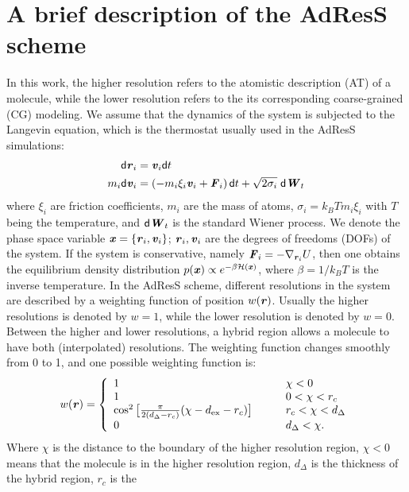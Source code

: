 \documentclass[aip,jcp,a4paper,reprint,onecolumn]{revtex4-1}
\newcommand{\vect}[1]{\textbf{\textit{#1}}}
\newcommand{\dd}[1]{\textsf{#1}}
\newcommand{\HY}{{\Delta}}
\begin{document}
\section{A brief description of the AdResS scheme}

In this work, the higher resolution refers to the atomistic
description (AT) of a molecule, while the lower resolution refers to
the its corresponding coarse-grained (CG) modeling.  We assume that the dynamics of the
system is subjected to the Langevin equation, which is the thermostat
usually used in the AdResS simulations:
\begin{align}
  \dd d\vect r_i &= \vect v_i\dd dt\\
  m_i\dd d\vect v_i &= (-m_i\xi_i\vect v_i + \vect F_i)\,\dd dt + \sqrt{2\sigma_i}\;\dd d\vect W_t
\end{align}
where $\xi_i$ are friction coefficients,
$m_i$ are the mass of atoms, $\sigma_i = k_BTm_i\xi_i$ with $T$ being
the temperature, and
$\dd d\vect W_t$ is the standard Wiener process. We denote the
phase space variable $\vect x = \{\vect r_i, \vect v_i\}$; $\vect r_i,
\vect v_i$ are the degrees of freedoms (DOFs) of the system.  If the
system is conservative, namely $\vect F_i = -\nabla_{\vect r_i}U$,
then one obtains the equilibrium density distribution $p(\vect
x)\propto e^{-\beta\mathcal H(\vect x)}$, where $\beta = 1/k_BT$ is the inverse temperature. In the AdResS scheme,
different resolutions in the system are described by a weighting
function of position $w(\vect r)$. Usually the higher resolutions is
denoted by $w = 1$, while the lower resolution is denoted by $w = 0$.
Between the higher and lower resolutions, a hybrid region allows a 
molecule to have both (interpolated) resolutions. The weighting function changes smoothly
from 0 to 1, and one possible weighting function is:
\begin{align}\label{eqn:new-w}
  w(\vect r) =
  \left\{
    \begin{array}{lcl}
      1 &\quad& \chi < 0\\
      1  && 0 < \chi < r_c\\
      \cos^2\big[\frac{\pi}{2(d_{\HY} - r_c)} (\chi - d_{\textrm{ex}} - r_c)\big] && r_c < \chi < d_{\HY} \\
      0 &&  d_{\HY}  < \chi.
    \end{array}
  \right.
\end{align}
Where $\chi$ is the distance to the boundary of the higher resolution
region, $\chi < 0$ means that the molecule is in the higher resolution
region, $d_{\HY}$ is the thickness of the hybrid region, $r_c$ is the
\end{document}
